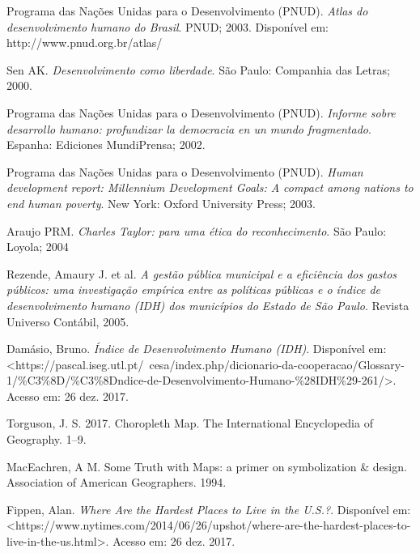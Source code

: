 \documentclass[conference]{IEEEtran}
\begin{document}
\begin{thebibliography}{1}


Programa das Nações Unidas para o Desenvolvimento (PNUD). \emph{Atlas do desenvolvimento humano do Brasil}. PNUD; 2003. Disponível em: http://www.pnud.org.br/atlas/

Sen AK. \emph{Desenvolvimento como liberdade}. São Paulo: Companhia das Letras; 2000.

Programa das Nações Unidas para o Desenvolvimento (PNUD). \emph{Informe sobre desarrollo humano: profundizar la democracia en un mundo fragmentado}. Espanha: Ediciones MundiPrensa; 2002.

Programa das Nações Unidas para o Desenvolvimento (PNUD). \emph{Human development report: Millennium Development Goals: A compact among nations to end human poverty}. New York: Oxford University Press; 2003.

Araujo PRM. \emph{Charles Taylor: para uma ética do reconhecimento}. São Paulo: Loyola; 2004

Rezende, Amaury J. et al. \emph{A gestão pública municipal e a eficiência dos gastos públicos: uma investigação empírica entre as políticas públicas e o índice de desenvolvimento humano (IDH) dos municípios do Estado de São Paulo}. Revista Universo Contábil, 2005.

Damásio, Bruno. \emph{Índice de Desenvolvimento Humano (IDH)}. Disponível em: <https://pascal.iseg.utl.pt/~cesa/index.php/dicionario-da-cooperacao/Glossary-1/\%C3\%8D/\%C3\%8Dndice-de-Desenvolvimento-Humano-\%28IDH\%29-261/>. Acesso em: 26 dez. 2017.

Torguson, J. S. 2017. Choropleth Map. The International Encyclopedia of Geography. 1–9.

MacEachren, A M. Some Truth with Maps: a primer on symbolization \& design. Association of American Geographers. 1994.

Fippen, Alan. \emph{Where Are the Hardest Places to Live in the U.S.?}. Disponível em: <https://www.nytimes.com/2014/06/26/upshot/where-are-the-hardest-places-to-live-in-the-us.html>. Acesso em: 26 dez. 2017.

\end{thebibliography}




\end{document}
